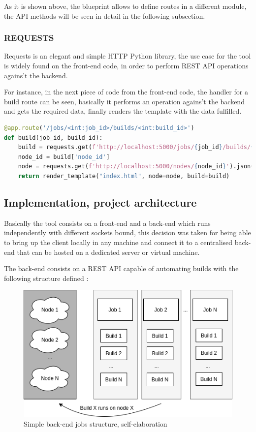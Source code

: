\documentclass{article}
\begin{document}
As it is shown above, the blueprint allows to define routes in a different module, the API methods will be seen in detail in the following subsection.

\subsubsection{REQUESTS}

Requests is an elegant and simple HTTP Python library, the use case for the tool is widely found on the front-end code, in order to perform REST API operations agains't the backend.

For instance, in the next piece of code from the front-end code, the handler for a build route can be seen, basically it performs an operation agains't the backend and gets the required data, finally renders the template with the data fulfilled.

\begin{lstlisting}[language=Python]
@app.route('/jobs/<int:job_id>/builds/<int:build_id>')
def build(job_id, build_id):
    build = requests.get(f'http://localhost:5000/jobs/{job_id}/builds/{build_id}').json()
    node_id = build['node_id']
    node = requests.get(f'http://localhost:5000/nodes/{node_id}').json()
    return render_template("index.html", node=node, build=build)
\end{lstlisting}

\subsection{Implementation, project architecture}

Basically the tool consists on a front-end and a back-end which runs independently with different sockets bound, this decision was taken for being able to bring up the client locally in any machine and connect it to a centralised back-end that can be hosted on a dedicated server or virtual machine.

The back-end consists on a REST API capable of automating builds with the following structure defined :

\begin{figure}[H]
    \centering
    \includegraphics[scale=0.6]{basicarch}
    \caption{Simple back-end jobs structure, self-elaboration}
\end{figure}
\end{document}
